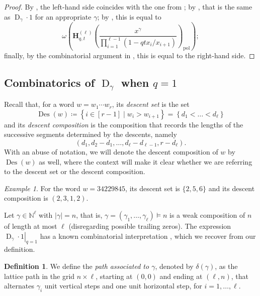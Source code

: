\documentclass[reqno]{amsart}
\theoremstyle{plain}
\theoremstyle{definition}
\newtheorem{definition}[theorem]{Definition}
\theoremstyle{remark}
\newtheorem{example}[theorem]{Example}
\DeclareMathOperator{\D}{D}
\DeclareMathOperator{\Des}{Des}
\newcommand{\<}{\langle}
\renewcommand{\>}{\rangle}
\begin{document}
\begin{proof}
    By \cite[Remark~3.25]{Mellit2021Rational}, the left-hand side coincides with the one from \cite[Conjecture~4.2]{BergeronGarsiaSergelXin2015CompositionalShuffleConjectures}; by , that is the same as $\D_\gamma \cdot 1$ for an appropriate $\gamma$; by , this is equal to
    \[ \omega \left( \mathbf{H}_{q,t}^{(\ell)}\left(\frac{x^\gamma}{\prod_{i=1}^{\ell-1}(1-qt x_i/x_{i+1})}\right)_{\mathrm{pol}} \right); \]
    finally, by the combinatorial argument in \cite[Theorem~5.5.1]{BHMPS2023ShuffleAnyLine}, this is equal to the right-hand side.
\end{proof}


\subsection{Combinatorics of \texorpdfstring{$\D_\gamma$}{Dgamma} when \texorpdfstring{$q=1$}{q=1}}

Recall that, for a word $w = w_1\cdots w_r$, its \emph{descent set} is the set
\[ \Des(w) \coloneqq \left\{ i \in [r-1] \mid w_i>w_{i+1} \right\} = \left\{d_1<\dots<d_\ell\right\} \]
and its \emph{descent composition} is the composition that records the lengths of the successive segments determined by the descents, namely
\[ \left(d_1,d_2-d_1,\dots,d_\ell-d_{\ell-1},r-d_\ell\right). \]
With an abuse of notation, we will denote the descent composition of $w$ by $\Des(w)$ as well, where the context will make it clear whether we are referring to the descent set or the descent composition.

\begin{example}
    For the word $w=34229845$, its descent set is $\{2,5,6\}$ and its descent composition is $(2,3,1,2)$.
\end{example}

Let $\gamma \in \mathbb{N}^\ell$ with $\lvert \gamma \rvert = n$, that is, $\gamma = (\gamma_1,\dots,\gamma_\ell) \vDash n$ is a weak composition of $n$ of length at most $\ell$ (disregarding possible trailing zeros). The expression $\left.\D_\gamma\cdot1\right\rvert_{q=1}$ has a known combinatorial interpretation \cite[Equation~(148)]{BHMPS2023ShuffleAnyLine}, which we recover from our definition.

\begin{definition}
    We define the \emph{path associated to $\gamma$}, denoted by $\delta(\gamma)$, as the lattice path in the grid $n\times\ell$, starting at $(0,0)$ and ending at $(\ell,n)$, that alternates $\gamma_i$ unit vertical steps and one unit horizontal step, for $i=1,\dots,\ell$.
\end{definition}
\end{document}
